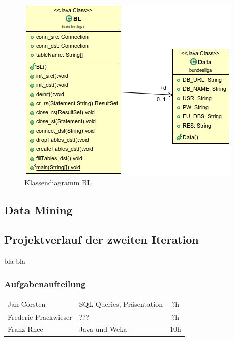 \documentclass[
10pt,
a4paper
]{scrartcl}
\begin{document}
\begin{figure}[hb]
	\centering
  \includegraphics[scale=0.7]{BL.png}
	\caption{Klassendiagramm BL}
	\label{fig4}
\end{figure}

\subsection{Data Mining}



\subsection{Projektverlauf der zweiten Iteration}
bla bla

\subsubsection{Aufgabenaufteilung}
\begin{tabular}{ l l c }
Jan Corsten & SQL Queries, Präsentation &  ?h \\
Frederic Prackwieser & ???  & ?h \\
Franz Rhee & Java und Weka & 10h \\
\end{tabular}
\end{document}
